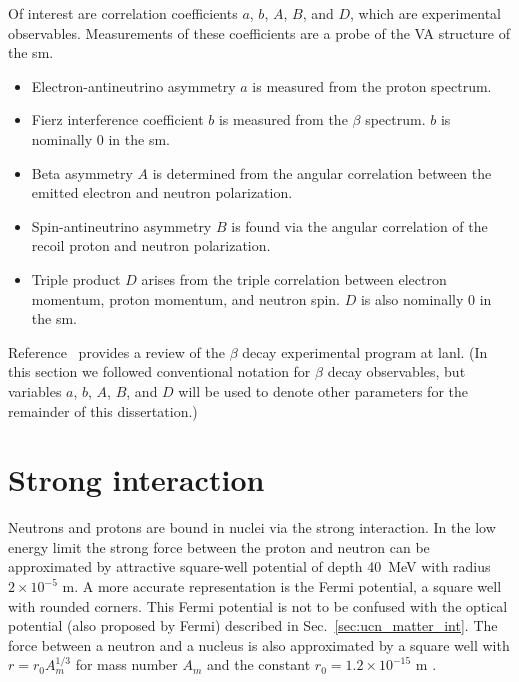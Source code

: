 Of interest are correlation coefficients $a$, $b$, $A$, $B$, and $D$, which are experimental observables. Measurements of these coefficients are a probe of the V\textendash A structure of the \acrshort*{sm}. 
%
\begin{itemize}
    \item Electron-antineutrino asymmetry $a$ is measured from the proton spectrum.
    \item Fierz interference coefficient $b$ is measured from the $\beta$ spectrum. $b$ is nominally $0$ in the \acrshort*{sm}.
    \item Beta asymmetry $A$ is determined from the angular correlation between the emitted electron and neutron polarization.
    \item Spin-antineutrino asymmetry $B$ is found via the angular correlation of the recoil proton and neutron polarization.
    \item Triple product $D$ arises from the triple correlation between electron momentum, proton momentum, and neutron spin. $D$ is also nominally $0$ in the \acrshort*{sm}.
\end{itemize}

Reference~\cite{Young2014} provides a review of the $\beta$ decay experimental program at \acrshort{lanl}. (In this section we followed conventional notation for $\beta$ decay observables, but variables $a$, $b$, $A$, $B$, and $D$ will be used to denote other parameters for the remainder of this dissertation.) 



\section{Strong interaction}


Neutrons and protons are bound in nuclei via the strong interaction. In the low energy limit the strong force between the proton and neutron can be approximated by attractive square-well potential of depth \qty{40}{\mega\eV} with radius $2\times10^{-5}\text{ m}$. A more accurate representation is the Fermi potential, a square well with rounded corners. This Fermi potential is not to be confused with the optical potential (also proposed by Fermi) described in Sec.~\ref{sec:ucn_matter_int}. The force between a neutron and a nucleus is also approximated by a square well with $r=r_0A_m^{1/3}$ for mass number $A_m$ and the constant $r_0=1.2\times10^{-15}\text{ m}$ \cite{golubUCN}.

